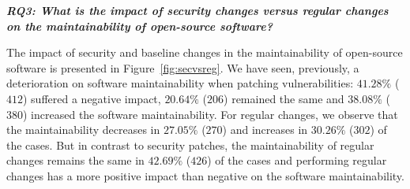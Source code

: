 \documentclass[10pt,conference]{IEEEtran}
\begin{document}
%




\textit{\textbf{RQ3: What is the impact of security changes versus regular 
changes on the maintainability of open-source software?}}

The impact of security and baseline changes in the maintainability of
open-source software is presented in Figure~\ref{fig:secvsreg}.  
We have seen, previously, a deterioration on software maintainability 
when patching vulnerabilities: $41.28\%$ ($412$) suffered a 
negative impact, $20.64\%$ ($206$) remained the same and $38.08\%$ 
($380$) increased the software maintainability. For regular changes, 
we observe that the maintainability decreases in $27.05\%$ ($270$) 
and increases in $30.26\%$ ($302$) of the cases. But in contrast to 
security patches, the maintainability of regular changes remains the 
same in $42.69\%$ ($426$) of the cases and performing regular
changes has a more positive impact than negative on the software 
maintainability. 
\end{document}
